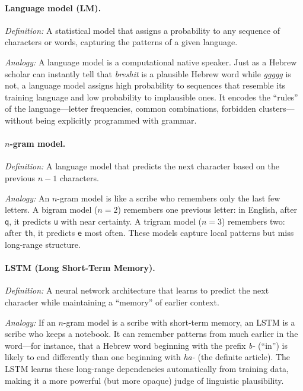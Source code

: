 \documentclass[11pt,a4paper]{article}
\begin{document}
\paragraph{Language model (LM).}
\textit{Definition:} A statistical model that assigns a probability to any sequence of characters or words, capturing the patterns of a given language.

\textit{Analogy:} A language model is a computational native speaker.  Just as a Hebrew scholar can instantly tell that \textit{breshit} is a plausible Hebrew word while \textit{ggggg} is not, a language model assigns high probability to sequences that resemble its training language and low probability to implausible ones.  It encodes the ``rules'' of the language---letter frequencies, common combinations, forbidden clusters---without being explicitly programmed with grammar.

\paragraph{$n$-gram model.}
\textit{Definition:} A language model that predicts the next character based on the previous $n-1$ characters.

\textit{Analogy:} An $n$-gram model is like a scribe who remembers only the last few letters.  A bigram model ($n=2$) remembers one previous letter: in English, after \texttt{q}, it predicts \texttt{u} with near certainty.  A trigram model ($n=3$) remembers two: after \texttt{th}, it predicts \texttt{e} most often.  These models capture local patterns but miss long-range structure.

\paragraph{LSTM (Long Short-Term Memory).}
\textit{Definition:} A neural network architecture that learns to predict the next character while maintaining a ``memory'' of earlier context.

\textit{Analogy:} If an $n$-gram model is a scribe with short-term memory, an LSTM is a scribe who keeps a notebook.  It can remember patterns from much earlier in the word---for instance, that a Hebrew word beginning with the prefix \textit{b-} (``in'') is likely to end differently than one beginning with \textit{ha-} (the definite article).  The LSTM learns these long-range dependencies automatically from training data, making it a more powerful (but more opaque) judge of linguistic plausibility.
\end{document}
